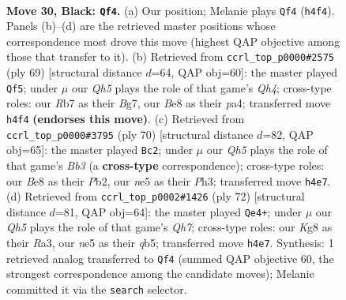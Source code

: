 \documentclass[11pt]{article}
\begin{document}
\clearpage

\begin{figure}[p]\centering
\begin{subfigure}{0.46\textwidth}\centering
\resizebox{\linewidth}{!}{%
\newchessgame
\chessboard[
  setfen={r3b1k1/pr3pP1/8/p3N3/4p2q/PP6/1Q3P2/R3R1K1 b - - 0 30},
  showmover=false,
  pgfstyle=straightmove, color=movearrow, markmove={h4-f4}
]}
\caption{}
\end{subfigure}\hfill
\begin{subfigure}{0.46\textwidth}\centering
\resizebox{\linewidth}{!}{%
\newchessgame
\chessboard[
  setfen={2r3k1/4p1b1/p5rp/3p3q/P7/1PPR1P2/1K2QB2/2R5 b - - 2 35},
  showmover=false,
  pgfstyle=straightmove, color=movearrow, markmove={h5-f5}
]}
\caption{}
\end{subfigure}
\\[4pt]
\begin{subfigure}{0.46\textwidth}\centering
\resizebox{\linewidth}{!}{%
\newchessgame
\chessboard[
  setfen={3rr2k/6p1/2q2n1p/1p1pp3/8/1BPQ3P/1P1R1PP1/4R1K1 w - - 0 36},
  showmover=false,
  pgfstyle=straightmove, color=movearrow, markmove={b3-c2}
]}
\caption{}
\end{subfigure}\hfill
\begin{subfigure}{0.46\textwidth}\centering
\resizebox{\linewidth}{!}{%
\newchessgame
\chessboard[
  setfen={2r5/3r1p1Q/2k1pP2/1q6/p1p4P/R1Bn2P1/1P2R2K/8 w - - 10 37},
  showmover=false,
  pgfstyle=straightmove, color=movearrow, markmove={h7-e4}
]}
\caption{}
\end{subfigure}
\caption{\textbf{Move 30, Black: \texttt{Qf4}.} (a) Our position; Melanie plays \texttt{Qf4} (\texttt{h4f4}). Panels (b)--(d) are the retrieved master positions whose correspondence most drove this move (highest QAP objective among those that transfer to it). (b) Retrieved from \texttt{ccrl\_top\_p0000\#2575} (ply 69) [structural distance $d$=64, QAP obj=60]: the master played \texttt{Qf5}; under $\mu$ our \emph{Qh5} plays the role of that game's \emph{Qh4}; cross-type roles: our \emph{R}b7 as their \emph{B}g7, our \emph{B}e8 as their \emph{p}a4; transferred move \texttt{h4f4} \textbf{(endorses this move)}. (c) Retrieved from \texttt{ccrl\_top\_p0000\#3795} (ply 70) [structural distance $d$=82, QAP obj=65]: the master played \texttt{Bc2}; under $\mu$ our \emph{Qh5} plays the role of that game's \emph{Bb3} (a \textbf{cross-type} correspondence); cross-type roles: our \emph{B}e8 as their \emph{P}b2, our \emph{n}e5 as their \emph{P}h3; transferred move \texttt{h4e7}. (d) Retrieved from \texttt{ccrl\_top\_p0002\#1426} (ply 72) [structural distance $d$=81, QAP obj=64]: the master played \texttt{Qe4+}; under $\mu$ our \emph{Qh5} plays the role of that game's \emph{Qh7}; cross-type roles: our \emph{K}g8 as their \emph{R}a3, our \emph{n}e5 as their \emph{q}b5; transferred move \texttt{h4e7}. Synthesis: 1 retrieved analog transferred to \texttt{Qf4} (summed QAP objective 60, the strongest correspondence among the candidate moves); Melanie committed it via the \texttt{search} selector.}
\label{fig:thought-m59}
\end{figure}
\end{document}
